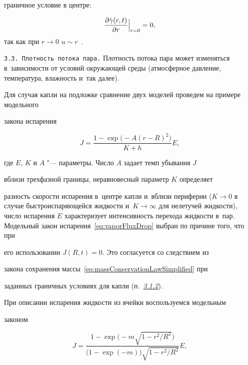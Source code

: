граничное условие в центре: 

$$

\frac{\partial \dgamma(r,t)}{\partial r}\Big|_{r=0}  = 0,

$$ так как при $r\to 0$ $u \sim r$~\cite{KolegovLobanov2012}.



\smallskip



\texttt{3.3. Плотность потока пара.} Плотность потока пара может изменяться в~зависимости от условий окружающей среды (атмосферное давление, температура, влажность и~так далее). 

Для случая капли на подложке сравнение двух моделей проведем на примере модельного

закона испарения~\cite{Fischer2002}

\begin{equation}\label{eq:vaporFluxDrop}

J = \frac{1 - \exp \bigl(- A(r - R)^2 \bigr)}{K + h}E,

\end{equation}

где $E$, $K$ и $A$ "--- параметры. Число $A$ задает темп убывания $J$

вблизи трехфазной границы, неравновесный параметр $K$ определяет

разность скорости испарения в~центре капли и~вблизи периферии ($K\to 0$ в случае быстроиспаряющейся жидкости и~$K\to \infty$ для нелетучей жидкости), число испарения $E$ характеризует интенсивность перехода жидкости в~пар. Модельный закон испарения~\eqref{eq:vaporFluxDrop} выбран по причине того, что при

его использовании ${J(R, t) = 0}$. Это согласуется со следствием из

закона сохранения массы~\eqref{eq:massConservationLawSimplified} при

заданных граничных условиях для капли (п.~\hyperlink{kol:3.1.2}{{\it 3.1.2}\/}).



При описании испарения жидкости из ячейки воспользуемся модельным

законом~\cite{Cachile2002}

\begin{equation}\label{eq:vaporFluxWell}

J = \frac{1 - \exp \bigl( - m\sqrt{1 - r^2 / R^2} \bigr)}{\bigl(1 - \exp(-m) \bigr)\sqrt{1 - r^2 / R^2}}E,

\end{equation}

